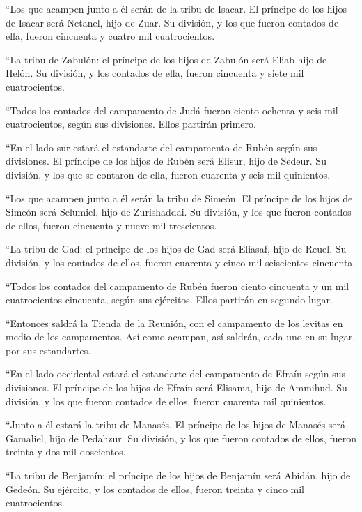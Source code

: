 \begin{paracol}{2}
 ``Los que acampen junto a él serán de la tribu de Isacar.
El príncipe de los hijos de Isacar será Netanel, hijo de Zuar.
 Su división, y los que fueron contados de ella, fueron
cincuenta y cuatro mil cuatrocientos.

 ``La tribu de Zabulón: el príncipe de los hijos de
Zabulón será Eliab hijo de Helón.  Su división, y los
contados de ella, fueron cincuenta y siete mil cuatrocientos.

 ``Todos los contados del campamento de Judá fueron ciento
ochenta y seis mil cuatrocientos, según sus divisiones. Ellos partirán
primero.

 ``En el lado sur estará el estandarte del campamento de
Rubén según sus divisiones. El príncipe de los hijos de Rubén será
Elisur, hijo de Sedeur.  Su división, y los que se
contaron de ella, fueron cuarenta y seis mil quinientos.

 ``Los que acampen junto a él serán la tribu de Simeón.
El príncipe de los hijos de Simeón será Selumiel, hijo de Zurishaddai.
 Su división, y los que fueron contados de ellos, fueron
cincuenta y nueve mil trescientos.

 ``La tribu de Gad: el príncipe de los hijos de Gad será
Eliasaf, hijo de Reuel.  Su división, y los contados de
ellos, fueron cuarenta y cinco mil seiscientos cincuenta.

 ``Todos los contados del campamento de Rubén fueron
ciento cincuenta y un mil cuatrocientos cincuenta, según sus ejércitos.
Ellos partirán en segundo lugar.

 ``Entonces saldrá la Tienda de la Reunión, con el
campamento de los levitas en medio de los campamentos. Así como acampan,
así saldrán, cada uno en su lugar, por sus estandartes.

 ``En el lado occidental estará el estandarte del
campamento de Efraín según sus divisiones. El príncipe de los hijos de
Efraín será Elisama, hijo de Ammihud.  Su división, y los
que fueron contados de ellos, fueron cuarenta mil quinientos.

 ``Junto a él estará la tribu de Manasés. El príncipe de
los hijos de Manasés será Gamaliel, hijo de Pedahzur.  Su
división, y los que fueron contados de ellos, fueron treinta y dos mil
doscientos.

 ``La tribu de Benjamín: el príncipe de los hijos de
Benjamín será Abidán, hijo de Gedeón.  Su ejército, y los
contados de ellos, fueron treinta y cinco mil cuatrocientos.


\end{paracol}
